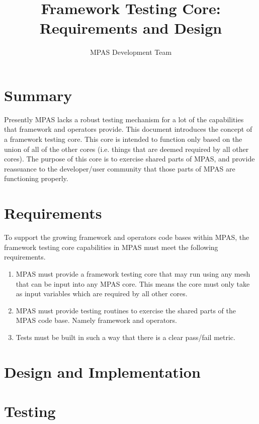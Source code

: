 \documentclass[11pt]{report}
\begin{document}
\title{Framework Testing Core: \\
Requirements and Design}
\author{MPAS Development Team}

\maketitle
\tableofcontents


\chapter{Summary}

Presently MPAS lacks a robust testing mechanism for a lot of the capabilities
that framework and operators provide. This document introduces the concept of a
framework testing core. This core is intended to function only based on the
union of all of the other cores (i.e. things that are deemed required by all
other cores). The purpose of this core is to exercise shared parts of MPAS, and
provide reassuance to the developer/user community that those parts of MPAS are
functioning properly.


\chapter{Requirements}

To support the growing framework and operators code bases within MPAS, the
framework testing core capabilities in MPAS must meet the following
requirements.

\begin{enumerate}

\item MPAS must provide a framework testing core that may run using any mesh
	  that can be input into any MPAS core. This means the core must only take as
	  input variables which are required by all other cores.

\item MPAS must provide testing routines to exercise the shared parts of the
      MPAS code base. Namely framework and operators.

\item Tests must be built in such a way that there is a clear pass/fail metric.

\end{enumerate}                                                             



\chapter{Design and Implementation}
\chapter{Testing}
\end{document}
